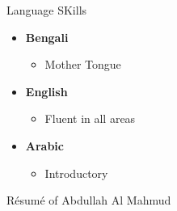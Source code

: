\documentclass[
]{book}
\providecommand{\tightlist}{%
  \setlength{\itemsep}{0pt}\setlength{\parskip}{0pt}}
\begin{document}
Language SKills

\begin{itemize}
\item
  \textbf{Bengali}

  \begin{itemize}
  \tightlist
  \item
    Mother Tongue
  \end{itemize}
\item
  \textbf{English}

  \begin{itemize}
  \tightlist
  \item
    Fluent in all areas
  \end{itemize}
\item
  \textbf{Arabic}

  \begin{itemize}
  \tightlist
  \item
    Introductory
  \end{itemize}
\end{itemize}

Résumé of Abdullah Al Mahmud
\end{document}
